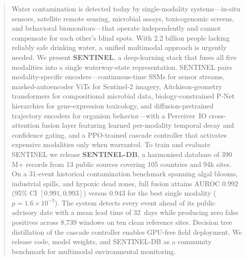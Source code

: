 \documentclass{article}
\begin{document}

\printAffiliationsAndNotice{}

\begin{abstract}
Water contamination is detected today by single-modality systems---in-situ sensors, satellite remote sensing, microbial assays, toxicogenomic screens, and behavioral biomonitors---that operate independently and cannot compensate for each other's blind spots. With 2.2 billion people lacking reliably safe drinking water, a unified multimodal approach is urgently needed. We present \textbf{SENTINEL}, a deep-learning stack that fuses all five modalities into a single waterway-state representation. SENTINEL pairs modality-specific encoders---continuous-time SSMs for sensor streams, masked-autoencoder ViTs for Sentinel-2 imagery, Aitchison-geometry transformers for compositional microbial data, biology-constrained P-Net hierarchies for gene-expression toxicology, and diffusion-pretrained trajectory encoders for organism behavior---with a Perceiver~IO cross-attention fusion layer featuring learned per-modality temporal decay and confidence gating, and a PPO-trained cascade controller that activates expensive modalities only when warranted. To train and evaluate SENTINEL we release \textbf{SENTINEL-DB}, a harmonised database of $390$\,M+ records from 13 public sources covering 105 countries and 94k sites. On a 31-event historical contamination benchmark spanning algal blooms, industrial spills, and hypoxic dead zones, full fusion attains AUROC $0.992$ (95\% CI $[0.991, 0.993]$) versus $0.943$ for the best single modality ($p\!=\!1.6\!\times\!10^{-3}$). The system detects every event ahead of its public advisory date with a mean lead time of 32~days while producing zero false positives across 8,739 windows on ten clean reference sites. Decision tree distillation of the cascade controller enables GPU-free field deployment. We release code, model weights, and SENTINEL-DB as a community benchmark for multimodal environmental monitoring.
\end{abstract}
\end{document}

